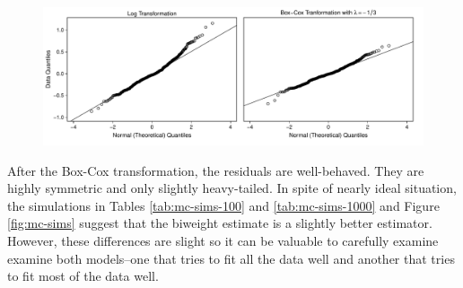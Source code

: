 \documentclass[12pt]{article}
\begin{document}
\begin{figure}[h!]
\begin{center}
\includegraphics[width = \textwidth]{figs/cg-trans-qq-plot.pdf}
\caption{}\label{fig:cg-trans-qq-plot}
\end{center}
\end{figure}

After the Box-Cox transformation, the residuals are well-behaved. They are highly symmetric and only slightly heavy-tailed. In spite of nearly ideal situation, the simulations in Tables \ref{tab:mc-sims-100} and \ref{tab:mc-sims-1000} and Figure \ref{fig:mc-sims} suggest that the biweight estimate is a slightly better estimator. However, these differences are slight so it can be valuable to carefully examine examine both models--one that tries to fit all the data well and another that tries to fit most of the data well. 



%
\end{document}
